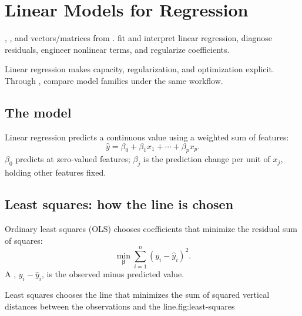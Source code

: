 \chapter{Linear Models for Regression}
\label{ch:regression}

\chapterguide%
  {, , and vectors/matrices from .}
  {fit and interpret linear regression, diagnose residuals, engineer nonlinear terms, and regularize coefficients.}

Linear regression makes capacity, regularization, and optimization explicit. Through , compare model families under the same workflow.

\section{The model}

Linear regression predicts a continuous value using a weighted sum of features:
\[
  \hat{y}=\beta_0+\beta_1x_1+\cdots+\beta_{p}x_{p}.
\]
$\beta_0$ predicts at zero-valued features; $\beta_j$ is the prediction change per unit of $x_j$, holding other features fixed.

\section{Least squares: how the line is chosen}

Ordinary least squares (OLS) chooses coefficients that minimize the residual sum of squares:
\[
  \min_{\bm{\beta}}
  \sum_{i=1}^{n}{(y_i-\hat{y}_i)}^2.
\]
A , $y_i-\hat y_i$, is the observed minus predicted value.

\begin{utpfig}{Least squares chooses the line that minimizes the sum of squared vertical distances between the observations and the line.}{fig:least-squares}
\end{utpfig}

